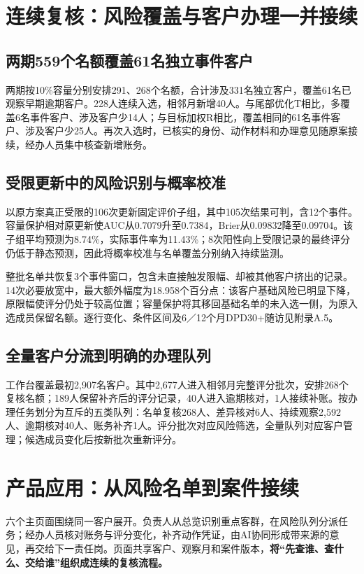 \clearpage
\section{连续复核：风险覆盖与客户办理一并接续}
\subsection{两期559个名额覆盖61名独立事件客户}
两期按10\%容量分别安排291、268个名额，合计涉及331名独立客户，覆盖61名已观察早期逾期客户。228人连续入选，相邻月新增40人。与尾部优化T相比，多覆盖6名事件客户、涉及客户少14人；与目标加权R相比，覆盖相同的61名事件客户、涉及客户少25人。再次入选时，已核实的身份、动作材料和办理意见随原案接续，经办人员集中核查新增账务。


\subsection{受限更新中的风险识别与概率校准}
以原方案真正受限的106次更新固定评价子组，其中105次结果可判，含12个事件。容量保护相对原更新使AUC从0.7079升至0.7384，Brier从0.09832降至0.09704。该子组平均预测为8.74\%，实际事件率为11.43\%；8次阳性向上受限记录的最终评分仍低于静态预测，因此将概率校准与名单覆盖分别纳入持续监测。

整批名单共恢复3个事件窗口，包含未直接触发限幅、却被其他客户挤出的记录。14次必要放宽中，最大额外幅度为18.958个百分点：该客户基础风险已明显下降，原限幅使评分仍处于较高位置；容量保护将其移回基础名单的未入选一侧，为原入选成员保留名额。逐行变化、条件区间及6／12个月DPD30+随访见附录A.5。

\subsection{全量客户分流到明确的办理队列}
工作台覆盖最初2,907名客户。其中2,677人进入相邻月完整评分批次，安排268个复核名额；189人保留补齐后的评分记录，40人进入逾期核对，1人接续补账。按办理任务划分为互斥的五类队列：名单复核268人、差异核对6人、持续观察2,592人、逾期核对40人、账务补齐1人。评分批次对应风险筛选，全量队列对应客户管理；候选成员变化后按新批次重新评分。

\clearpage
\section{产品应用：从风险名单到案件接续}
六个主页面围绕同一客户展开。负责人从总览识别重点客群，在风险队列分派任务；经办人员核对账务与评分变化，补齐动作凭证，由AI协同形成带来源的意见，再交给下一责任岗。页面共享客户、观察月和案件版本，\textbf{将“先查谁、查什么、交给谁”组织成连续的复核流程。}

